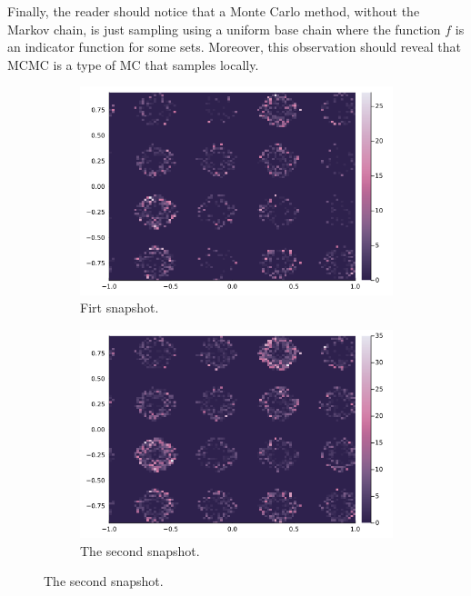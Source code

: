 \documentclass[]{article}
\theoremstyle{definition}
\begin{document}
        \par
        Finally, the reader should notice that a Monte Carlo method, without the Markov chain, is just sampling using a uniform base chain where the function $f$ is an indicator function for some sets. Moreover, this observation should reveal that MCMC is a type of MC that samples locally. 
        \begin{figure}[H]
            \centering
            \begin{subfigure}{0.3\textwidth}
                \includegraphics[width=\textwidth]{gaussian_base(1).png}
                \caption{Firt snapshot.}
            \end{subfigure}
            \hfill
            \begin{subfigure}{0.3\textwidth}
                \includegraphics[width=\textwidth]{gaussian_base(2).png}
                \caption{The second snapshot.}

\end{subfigure}
\end{figure}
\end{document}
